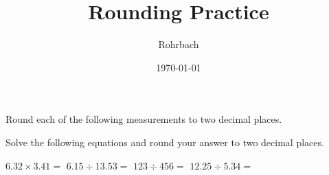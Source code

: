 \documentclass[12pt]{exam}
\title{Rounding Practice}
\author{Rohrbach}
\date{\today}
\begin{document}
\maketitle

\begin{questions}
  
  \begin{EnvUplevel}
    Round each of the following measurements to two decimal places.
  \end{EnvUplevel}

  \newcommand{\myspace}{\vspace{3em}}
  \begin{multicols}{2}
     \myspace
     \myspace
     \myspace
     \myspace 
     \myspace
     \myspace
     \myspace
     \myspace
     \myspace
     \myspace
     \myspace
     \myspace
      \myspace
      \myspace
  \end{multicols}
  \myspace


  \begin{EnvUplevel}
    Solve the following equations and round your answer to two decimal places.
  \end{EnvUplevel}

  \begin{multicols}{2} 
    \question $6.32  \times  3.41 = $ \myspace
    \question $6.15  \div   13.53 = $ \myspace
    \question $123   \div  456    = $ \myspace
    \question $12.25 \div    5.34 = $ \myspace
  \end{multicols}

  
\end{questions}
\end{document}
